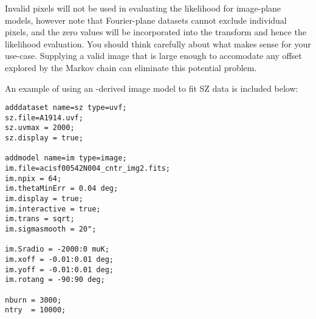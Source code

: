 Invalid pixels will not be used in evaluating the likelihood for
image-plane models, however note that Fourier-plane datasets cannot
exclude individual pixels, and the zero values will be incorporated
into the transform and hence the likelihood evaluation.  You should
think carefully about what makes sense for your use-case.  Supplying a
valid image that is large enough to accomodate any offset explored by
the Markov chain can eliminate this potential problem.

An example of using an \xray-derived image model to fit SZ data is included below:

\begin{myindentpar}{3cm}
\small
\begin{verbatim}
adddataset name=sz type=uvf;
sz.file=A1914.uvf;
sz.uvmax = 2000;
sz.display = true;

addmodel name=im type=image;
im.file=acisf00542N004_cntr_img2.fits;
im.npix = 64;
im.thetaMinErr = 0.04 deg;
im.display = true;
im.interactive = true;
im.trans = sqrt;
im.sigmasmooth = 20";

im.Sradio = -2000:0 muK;
im.xoff = -0.01:0.01 deg;
im.yoff = -0.01:0.01 deg;
im.rotang = -90:90 deg;

nburn = 3000;
ntry  = 10000;

\end{verbatim}
\end{myindentpar}
